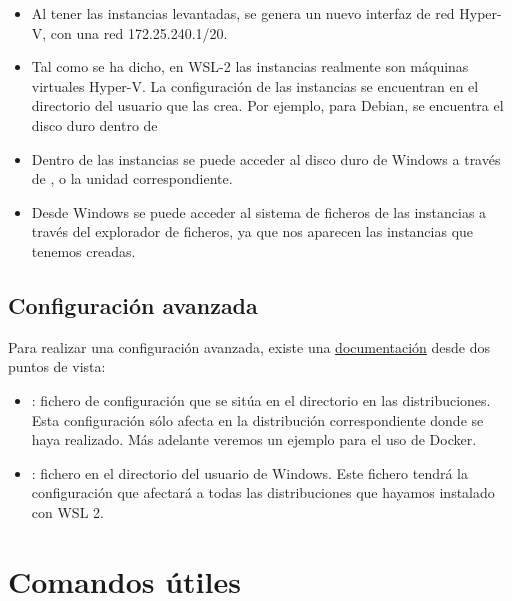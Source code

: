 \begin{itemize}
    \item Al tener las instancias levantadas, se genera un nuevo interfaz de red Hyper-V, con una red 172.25.240.1/20.

    \item Tal como se ha dicho, en WSL-2 las instancias realmente son máquinas virtuales Hyper-V. La configuración de las instancias se encuentran en el directorio  del usuario que las crea. Por ejemplo, para Debian, se encuentra el disco duro dentro de 

    \item Dentro de las instancias se puede acceder al disco duro de Windows a través de , o la unidad correspondiente.

    \item Desde Windows se puede acceder al sistema de ficheros de las instancias a través del explorador de ficheros, ya que nos aparecen las instancias que tenemos creadas.
\end{itemize}

\section{Configuración avanzada}

Para realizar una configuración avanzada, existe una \href{https://learn.microsoft.com/en-us/windows/wsl/wsl-config}{documentación} desde dos puntos de vista:

\begin{itemize}
    \item {}: fichero de configuración que se sitúa en el directorio  en las distribuciones. Esta configuración sólo afecta en la distribución correspondiente donde se haya realizado. Más adelante veremos un ejemplo para el uso de Docker.

    \item {}: fichero en el directorio del usuario de Windows. Este fichero tendrá la configuración que afectará a todas las distribuciones que hayamos instalado con WSL 2.
\end{itemize}


\chapter{Comandos útiles}

